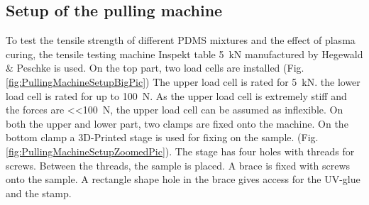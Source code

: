 \subsection{Setup of the pulling machine}

To test the tensile strength of different PDMS mixtures and the effect of plasma curing, the tensile testing machine Inspekt table \SI{5}{\kilo\newton} manufactured by Hegewald \& Peschke is used. On the top part, two load cells are installed (Fig. \ref{fig:PullingMachineSetupBigPic}) The upper load cell is rated for \SI{5}{\kilo\newton}. the lower load cell is rated for up to \SI{100}{\newton}. As the upper load cell is extremely stiff and the forces are \SI{<<100}{\newton}, the upper load cell can be assumed as inflexible. On both the upper and lower part, two clamps are fixed onto the machine. On the bottom clamp a 3D-Printed stage is used for fixing on the sample. (Fig. \ref{fig:PullingMachineSetupZoomedPic}). The stage has four holes with threads for screws. Between the threads, the sample is placed. A brace is fixed with screws onto the sample. A rectangle shape hole in the brace gives access for the UV-glue and the stamp. 

